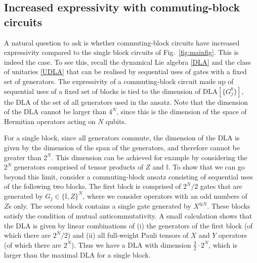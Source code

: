 \documentclass[twocolumn]{revtex4-2}
\begin{document}
\subsection{Increased expressivity with commuting-block circuits}\label{sec:increasedexpressivity}
A natural question to ask is whether commuting-block circuits have increased expressivity compared to the single block circuits of Fig.\ \ref{fig:mainfig}. This is indeed the case. To see this, recall the dynamical Lie algebra \eqref{DLA}
and the class of unitaries \eqref{UDLA} that can be realised by sequential uses of gates with a fixed set of generators. The expressivity of a commuting-block circuit made up of sequential uses of a fixed set of blocks is tied to the dimension of $\text{DLA}[\{G_j^b\}]$, the DLA of the set of all generators used in the ansatz. Note that the dimension of the DLA cannot be larger than $4^N$, since this is the dimension of the space of Hermitian operators acting on $N$ qubits. 
%
%

For a single block, since all generators commute, the dimension of the DLA is given by the dimension of the span of the generators, and therefore cannot be greater than $2^N$. This dimension can be achieved for example by considering the $2^N$ generators comprised of tensor products of $Z$ and $\mathbb{I}$. 
To show that we can go beyond this limit, consider a commuting-block ansatz consisting of sequential uses of the following two blocks. The first block is comprised of $2^N/2$ gates that are generated by $G_j\in\{\mathbb{I}, Z\}^N$, where we consider operators with an odd numbers of $Z$s only. The second block contains a single gate generated by $X^{\otimes N}$.
These blocks satisfy the condition of mutual anticommutativity. A small calculation shows that the DLA is given by linear combinations of (i) the generators of the first block (of which there are $2^N/2$) and (ii) all full-weight Pauli tensors of $X$ and $Y$ operators (of which there are $2^N$). Thus we have a DLA with dimension $\frac{3}{2}\cdot 2^N$, which is larger than the maximal DLA for a single block. 
\end{document}
